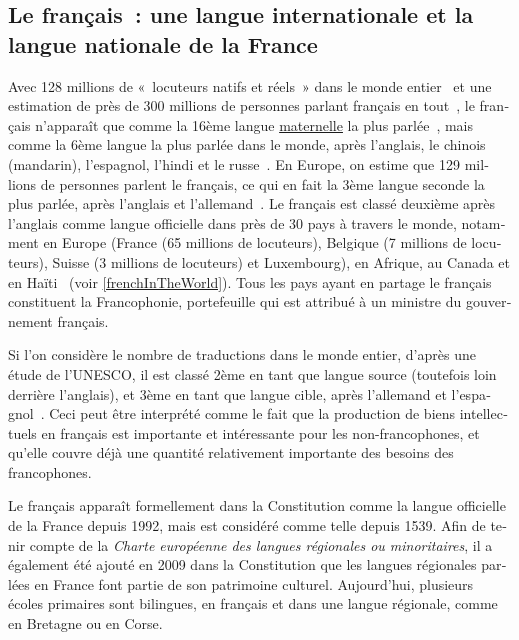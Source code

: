 \begin{french}

\begin{multicols}{2}

\subsection{Le français~: une langue internationale et la langue nationale de la France}
Avec 128 millions de «~locuteurs natifs et réels~» dans le monde
entier~\cite{native} et une estimation de près de 300 millions de
personnes parlant français en tout~\cite{francais}, le français
n'apparaît que comme la 16ème langue \underline{maternelle} la plus
parlée~\cite{Lewis2009}, mais comme la 6ème langue la plus parlée dans
le monde, après l'anglais, le chinois (mandarin), l'espagnol, l'hindi et
le russe~\cite{russe}. En Europe, on estime que 129 millions de
personnes parlent le français, ce qui en fait la 3ème langue seconde la
plus parlée, après l'anglais et l'allemand~\cite{francais}. Le français est classé
deuxième après l'anglais comme langue officielle dans près de 30 pays
à travers le monde, notamment en Europe (France (65 millions de
locuteurs), Belgique (7 millions de locuteurs), Suisse (3 millions de
locuteurs) et Luxembourg), en Afrique, au Canada et en
Haïti~\cite{haiti} (voir \ref{frenchInTheWorld}). Tous les pays ayant en partage le
français constituent la Francophonie, portefeuille qui est attribué à
un ministre du gouvernement français.

Si l'on considère le nombre de traductions dans le monde
entier, d'après une étude de l'UNESCO, il est classé 2ème en
tant que langue source (toutefois loin derrière l'anglais), et
3ème en tant que langue cible, après l'allemand et l'espagnol~\cite{espagnol}. Ceci peut être interprété comme le fait
que la production de biens intellectuels en français est importante et
intéressante pour les non-francophones, et qu'elle couvre déjà
une quantité relativement importante des besoins des francophones.

Le français apparaît formellement dans la Constitution comme la langue
officielle de la France depuis 1992, mais est considéré comme telle
depuis 1539. Afin de tenir compte de la {\em Charte européenne des langues
régionales ou minoritaires}, il a également été ajouté en 2009 dans la
Constitution que les langues régionales parlées en France font partie
de son patrimoine culturel. Aujourd'hui, plusieurs écoles primaires
sont bilingues, en français et dans une langue régionale, comme en
Bretagne ou en Corse.


\end{multicols}
\end{french}
